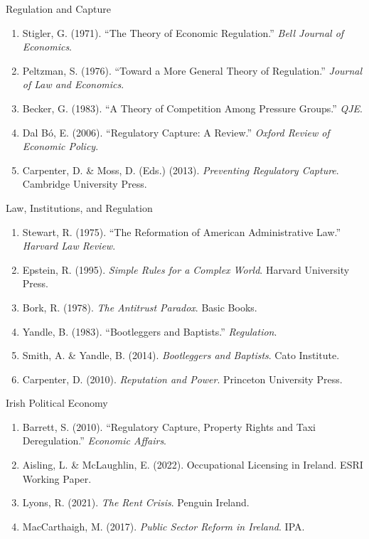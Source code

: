\documentclass[10pt]{beamer}
\begin{document}
\begin{frame}{Regulation and Capture}
\footnotesize
\begin{enumerate}
\item Stigler, G. (1971). “The Theory of Economic Regulation.” \emph{Bell Journal of Economics}.
\item Peltzman, S. (1976). “Toward a More General Theory of Regulation.” \emph{Journal of Law and Economics}.
\item Becker, G. (1983). “A Theory of Competition Among Pressure Groups.” \emph{QJE}.
\item Dal B\'{o}, E. (2006). “Regulatory Capture: A Review.” \emph{Oxford Review of Economic Policy}.
\item Carpenter, D. \& Moss, D. (Eds.) (2013). \emph{Preventing Regulatory Capture}. Cambridge University Press.
\end{enumerate}
\end{frame}

\begin{frame}{Law, Institutions, and Regulation}
\footnotesize
\begin{enumerate}
\item Stewart, R. (1975). “The Reformation of American Administrative Law.” \emph{Harvard Law Review}.
\item Epstein, R. (1995). \emph{Simple Rules for a Complex World}. Harvard University Press.
\item Bork, R. (1978). \emph{The Antitrust Paradox}. Basic Books.
\item Yandle, B. (1983). “Bootleggers and Baptists.” \emph{Regulation}.
\item Smith, A. \& Yandle, B. (2014). \emph{Bootleggers and Baptists}. Cato Institute.
\item Carpenter, D. (2010). \emph{Reputation and Power}. Princeton University Press.
\end{enumerate}
\end{frame}

\begin{frame}{Irish Political Economy}
\footnotesize
\begin{enumerate}
\item Barrett, S. (2010). “Regulatory Capture, Property Rights and Taxi Deregulation.” \emph{Economic Affairs}.
\item Aisling, L. \& McLaughlin, E. (2022). Occupational Licensing in Ireland. ESRI Working Paper.
\item Lyons, R. (2021). \emph{The Rent Crisis}. Penguin Ireland.
\item MacCarthaigh, M. (2017). \emph{Public Sector Reform in Ireland}. IPA.
\end{enumerate}
\end{frame}
\end{document}
